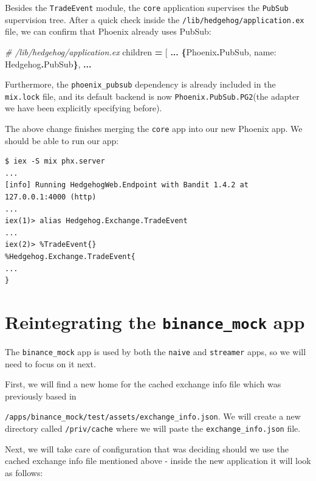 \documentclass[
  oneside]{book}
\newenvironment{Shaded}{\begin{snugshade}}{\end{snugshade}}
\newcommand{\CommentTok}[1]{\textcolor[rgb]{0.56,0.35,0.01}{\textit{#1}}}
\newcommand{\ConstantTok}[1]{\textcolor[rgb]{0.56,0.35,0.01}{#1}}
\newcommand{\FunctionTok}[1]{\textcolor[rgb]{0.13,0.29,0.53}{\textbf{#1}}}
\newcommand{\NormalTok}[1]{#1}
\newcommand{\OperatorTok}[1]{\textcolor[rgb]{0.81,0.36,0.00}{\textbf{#1}}}
\newcommand{\OtherTok}[1]{\textcolor[rgb]{0.56,0.35,0.01}{#1}}
\newcommand{\VariableTok}[1]{\textcolor[rgb]{0.00,0.00,0.00}{#1}}
\begin{document}
Besides the \texttt{TradeEvent} module, the \texttt{core} application supervises the \texttt{PubSub} supervision tree. After a quick check inside the \texttt{/lib/hedgehog/application.ex} file, we can confirm that Phoenix already uses PubSub:

\begin{Shaded}
\begin{Highlighting}[]
  \CommentTok{\# /lib/hedgehog/application.ex}
\NormalTok{    children }\OperatorTok{=} \OtherTok{[}
      \OperatorTok{...}
      \FunctionTok{\{}\ConstantTok{Phoenix}\OperatorTok{.}\ConstantTok{PubSub}\NormalTok{, }\VariableTok{name:} \ConstantTok{Hedgehog}\OperatorTok{.}\ConstantTok{PubSub}\FunctionTok{\}}\NormalTok{,}
    \OperatorTok{...}
\end{Highlighting}
\end{Shaded}

Furthermore, the \texttt{phoenix\_pubsub} dependency is already included in the \texttt{mix.lock} file, and its default backend is now \texttt{Phoenix.PubSub.PG2}(the adapter we have been explicitly specifying before).

The above change finishes merging the \texttt{core} app into our new Phoenix app. We should be able to run our app:

\begin{verbatim}
$ iex -S mix phx.server
...
[info] Running HedgehogWeb.Endpoint with Bandit 1.4.2 at 127.0.0.1:4000 (http)
...
iex(1)> alias Hedgehog.Exchange.TradeEvent
...
iex(2)> %TradeEvent{}
%Hedgehog.Exchange.TradeEvent{
...
}
\end{verbatim}

\section{\texorpdfstring{Reintegrating the \texttt{binance\_mock} app}{Reintegrating the binance\_mock app}}\label{reintegrating-the-binance_mock-app}

The \texttt{binance\_mock} app is used by both the \texttt{naive} and \texttt{streamer} apps, so we will need to focus on it next.

First, we will find a new home for the cached exchange info file which was previously based in

\texttt{/apps/binance\_mock/test/assets/exchange\_info.json}. We will create a new directory called \texttt{/priv/cache} where we will paste the \texttt{exchange\_info.json} file.

Next, we will take care of configuration that was deciding should we use the cached exchange info file mentioned above - inside the new application it will look as follows:
\end{document}
